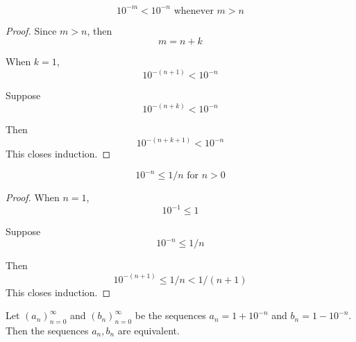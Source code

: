 \documentclass{blog}
\begin{document}
\begin{lemma}
  \begin{equation*}
    10^{-m} < 10^{-n} \text{ whenever } m > n
  \end{equation*}
\end{lemma}

\begin{proof}
  Since $m > n$, then
  \begin{equation*}
    m = n + k
  \end{equation*}

  When $k = 1$,
  \begin{equation*}
    10^{-(n + 1)} < 10^{-n}
  \end{equation*}

  Suppose
  \begin{equation}
    10^{-(n + k)} < 10^{-n}
  \end{equation}

  Then
  \begin{equation*}
    10^{-(n + k + 1)} < 10^{-n}
  \end{equation*}
  This closes induction.
\end{proof}

\begin{lemma}
  \begin{equation*}
    10^{-n} \leq 1 / n \text{ for } n > 0
  \end{equation*}
\end{lemma}

\begin{proof}
  When $n = 1$,
  \begin{equation*}
    10^{-1} \leq 1
  \end{equation*}

  Suppose
  \begin{equation*}
    10^{-n} \leq 1 / n
  \end{equation*}

  Then
  \begin{equation*}
    10^{-(n + 1)} \leq 1 / n < 1 / (n + 1)
  \end{equation*}
  This closes induction.
\end{proof}

\begin{proposition}
  Let $(a_{n})_{n = 0}^{\infty}$ and $(b_{n})_{n = 0}^{\infty}$ be the sequences
  $a_{n} = 1 + 10^{-n}$ and $b_{n} = 1 - 10^{-n}$. Then the sequences $a_{n}, b_{n}$ are equivalent.
\end{proposition}
\end{document}
